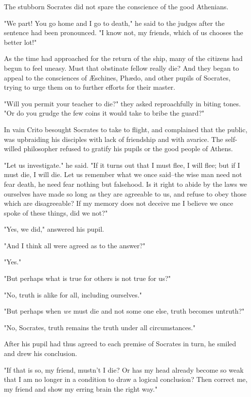 The stubborn Socrates did not spare the conscience of the good
Athenians.

"We part! You go home and I go to death," he said to the judges after
the sentence had been pronounced. "I know not, my friends, which of us
chooses the better lot!"

As the time had approached for the return of the ship, many of the
citizens had begun to feel uneasy. Must that obstinate fellow really
die? And they began to appeal to the consciences of Æschines, Phædo,
and other pupils of Socrates, trying to urge them on to further
efforts for their master.

"Will you permit your teacher to die?" they asked reproachfully in
biting tones. "Or do you grudge the few coins it would take to bribe
the guard?"

In vain Crito besought Socrates to take to flight, and complained that
the public, was upbraiding his disciples with lack of friendship and
with avarice. The self-willed philosopher refused to gratify his
pupils or the good people of Athens.

"Let us investigate." he said. "If it turns out that I must flee, I
will flee; but if I must die, I will die. Let us remember what we once
said--the wise man need not fear death, he need fear nothing but
falsehood. Is it right to abide by the laws we ourselves have made so
long as they are agreeable to us, and refuse to obey those which are
disagreeable? If my memory does not deceive me I believe we once spoke
of these things, did we not?"

"Yes, we did," answered his pupil.

"And I think all were agreed as to the answer?"

"Yes."

"But perhaps what is true for others is not true for us?"

"No, truth is alike for all, including ourselves."

"But perhaps when \emph{we} must die and not some one else, truth becomes
untruth?"

"No, Socrates, truth remains the truth under all circumstances."

After his pupil had thus agreed to each premise of Socrates in turn,
he smiled and drew his conclusion.

"If that is so, my friend, mustn't I die? Or has my head already
become so weak that I am no longer in a condition to draw a logical
conclusion? Then correct me, my friend and show my erring brain the
right way."

